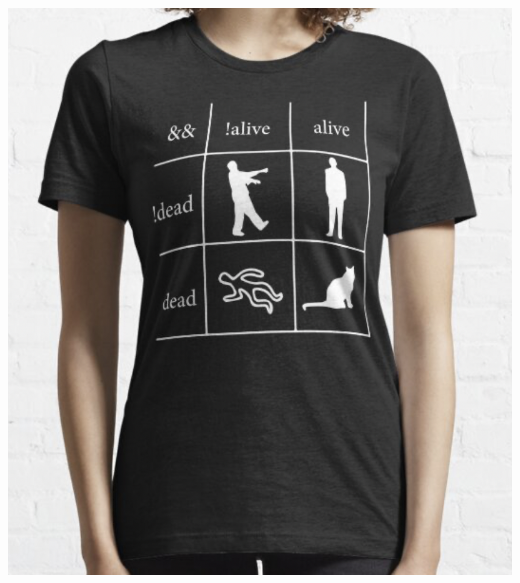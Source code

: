 \documentclass[
10pt, %
aspectratio=169, %
]{beamer}
\begin{document}
	\begin{frame}
	
		\centering
		\includegraphics[height=\paperheight]{meme-modelo-booleano.png}
	
	\end{frame}
		
\end{document}
